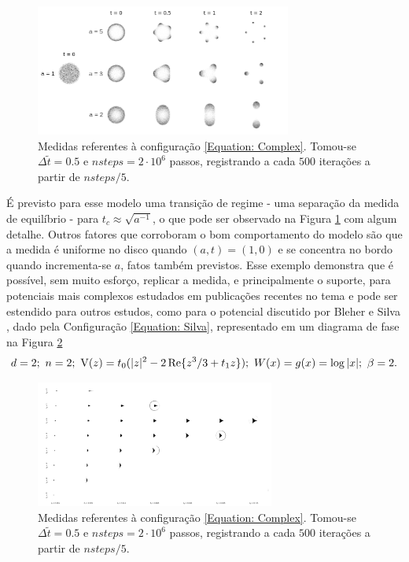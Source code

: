 \documentclass[12pt]{report}
\begin{document}
\begin{figure}[ht]
	\centering
	\includegraphics[width=0.75\textwidth]{Assets/complexPotential.png}
	\caption{Medidas referentes à configuração \eqref{Equation: Complex}. Tomou-se $\Delta \tilde{t} = 0.5$ e $nsteps = 2\cdot10^6$ passos, registrando a cada $500$ iterações a partir de $nsteps/5$.}
	\label{Figura: Complex}
\end{figure}

É previsto para esse modelo uma transição de regime - uma separação da medida de equilíbrio - para $t_c \approx \sqrt{a^{-1}}$, o que pode ser observado na Figura \ref{Figura: Complex} com algum detalhe. Outros fatores que corroboram o bom comportamento do modelo são que a medida é uniforme no disco quando $(a,t) = (1,0)$ e se concentra no bordo quando incrementa-se $a$, fatos também previstos. \cite{balogh2016orthogonal} Esse exemplo demonstra que é possível, sem muito esforço, replicar a medida, e principalmente o suporte, para potenciais mais complexos estudados em publicações recentes no tema e pode ser estendido para outros estudos, como para o potencial discutido por Bleher e Silva \cite{Silva}, dado pela Configuração \eqref{Equation: Silva}, representado em um diagrama de fase na Figura \ref{Figura: Silva}  
\begin{equation}
	d = 2; \  n = 2; \  \operatorname{V}(z)= t_0(|z|^{2} - 2\mathop{\rm Re}\{z^3/3 + t_1 z\});  \ W(x) = g(x) = \log{|x|}; \ \beta = 2.
	\label{Equation: Silva}
\end{equation}
\begin{figure}[ht]
	\centering
	\includegraphics[width=0.7\textwidth]{Assets/allshapes.png}
	\caption{Medidas referentes à configuração \eqref{Equation: Complex}. Tomou-se $\Delta \tilde{t} = 0.5$ e $nsteps = 2\cdot10^6$ passos, registrando a cada $500$ iterações a partir de $nsteps/5$.}
	\label{Figura: Silva}
\end{figure}
\end{document}
